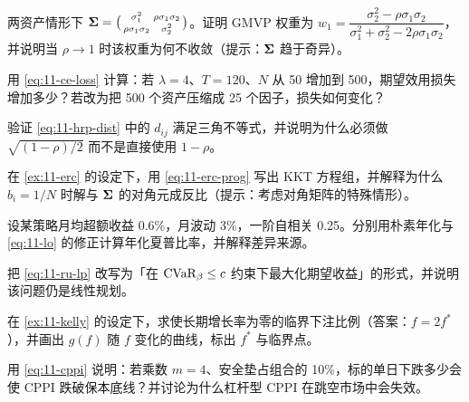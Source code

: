 \begin{exercises}
  \item 两资产情形下 $\bm{\Sigma} = \bigl(\begin{smallmatrix}\sigma_1^{2} & \rho\sigma_1\sigma_2\\ \rho\sigma_1\sigma_2 & \sigma_2^{2}\end{smallmatrix}\bigr)$。证明 GMVP 权重为 $w_1 = \dfrac{\sigma_2^{2} - \rho\sigma_1\sigma_2}{\sigma_1^{2}+\sigma_2^{2}-2\rho\sigma_1\sigma_2}$，并说明当 $\rho \to 1$ 时该权重为何不收敛（提示：$\bm{\Sigma}$ 趋于奇异）。
  \item 用 \cref{eq:11-ce-loss} 计算：若 $\lambda = 4$、$T = 120$、$N$ 从 50 增加到 500，期望效用损失增加多少？若改为把 500 个资产压缩成 25 个因子，损失如何变化？
  \item 验证 \cref{eq:11-hrp-dist} 中的 $d_{ij}$ 满足三角不等式，并说明为什么必须做 $\sqrt{(1-\rho)/2}$ 而不是直接使用 $1-\rho$。
  \item 在 \cref{ex:11-erc} 的设定下，用 \cref{eq:11-erc-prog} 写出 KKT 方程组，并解释为什么 $b_i = 1/N$ 时解与 $\bm{\Sigma}$ 的对角元成反比（提示：考虑对角矩阵的特殊情形）。
  \item 设某策略月均超额收益 0.6\%，月波动 3\%，一阶自相关 0.25。分别用朴素年化与 \cref{eq:11-lo} 的修正计算年化夏普比率，并解释差异来源。
  \item 把 \cref{eq:11-ru-lp} 改写为「在 $\operatorname{CVaR}_\beta \le c$ 约束下最大化期望收益」的形式，并说明该问题仍是线性规划。
  \item 在 \cref{ex:11-kelly} 的设定下，求使长期增长率为零的临界下注比例（答案：$f = 2f^{*}$），并画出 $g(f)$ 随 $f$ 变化的曲线，标出 $f^{*}$ 与临界点。
  \item 用 \cref{eq:11-cppi} 说明：若乘数 $m = 4$、安全垫占组合的 10\%，标的单日下跌多少会使 CPPI 跌破保本底线？并讨论为什么杠杆型 CPPI 在跳空市场中会失效。
\end{exercises}

